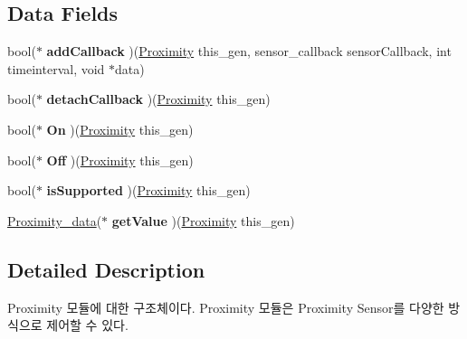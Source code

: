 \subsection*{Data Fields}
\begin{DoxyCompactItemize}
\item 
\hypertarget{struct__Proximity_a34233b2c53cafa32a16fee93bc87ee4d}{bool($\ast$ {\bfseries add\-Callback} )(\hyperlink{struct__Proximity}{Proximity} this\-\_\-gen, sensor\-\_\-callback sensor\-Callback, int timeinterval, void $\ast$data)}\label{struct__Proximity_a34233b2c53cafa32a16fee93bc87ee4d}

\item 
\hypertarget{struct__Proximity_ae3b089dbc605cca6672de861f726299d}{bool($\ast$ {\bfseries detach\-Callback} )(\hyperlink{struct__Proximity}{Proximity} this\-\_\-gen)}\label{struct__Proximity_ae3b089dbc605cca6672de861f726299d}

\item 
\hypertarget{struct__Proximity_a430c35da418a70bf04d59918d117c855}{bool($\ast$ {\bfseries On} )(\hyperlink{struct__Proximity}{Proximity} this\-\_\-gen)}\label{struct__Proximity_a430c35da418a70bf04d59918d117c855}

\item 
\hypertarget{struct__Proximity_a387e00eb751ec2969828e147580cf074}{bool($\ast$ {\bfseries Off} )(\hyperlink{struct__Proximity}{Proximity} this\-\_\-gen)}\label{struct__Proximity_a387e00eb751ec2969828e147580cf074}

\item 
\hypertarget{struct__Proximity_adfb2002e855b02ccf6f3dbcd636723ea}{bool($\ast$ {\bfseries is\-Supported} )(\hyperlink{struct__Proximity}{Proximity} this\-\_\-gen)}\label{struct__Proximity_adfb2002e855b02ccf6f3dbcd636723ea}

\item 
\hypertarget{struct__Proximity_abf3276a84c1e43e8e5ff5ecb6c665ee1}{\hyperlink{Sensor_8h_db/d98/struct__Proximity__data}{Proximity\-\_\-data}($\ast$ {\bfseries get\-Value} )(\hyperlink{struct__Proximity}{Proximity} this\-\_\-gen)}\label{struct__Proximity_abf3276a84c1e43e8e5ff5ecb6c665ee1}

\end{DoxyCompactItemize}


\subsection{Detailed Description}
Proximity 모듈에 대한 구조체이다. Proximity 모듈은 Proximity Sensor를 다양한 방식으로 제어할 수 있다. 

